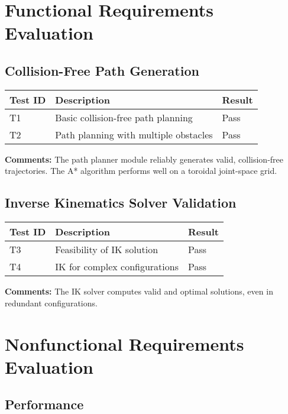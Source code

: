 \documentclass[12pt, titlepage]{article}
\begin{document}
\newpage

\tableofcontents
\newpage


\section{Functional Requirements Evaluation}

\subsection*{Collision-Free Path Generation}

\begin{tabularx}{\textwidth}{l X l}
\toprule
\textbf{Test ID} & \textbf{Description} & \textbf{Result} \\
\midrule
T1 & Basic collision-free path planning & Pass \\
T2 & Path planning with multiple obstacles & Pass \\
\bottomrule
\end{tabularx}

\textbf{Comments:} The path planner module reliably generates valid, collision-free trajectories. The A* algorithm performs well on a toroidal joint-space grid.

\subsection*{Inverse Kinematics Solver Validation}

\begin{tabularx}{\textwidth}{l X l}
\toprule
\textbf{Test ID} & \textbf{Description} & \textbf{Result} \\
\midrule
T3 & Feasibility of IK solution & Pass \\
T4 & IK for complex configurations & Pass \\
\bottomrule
\end{tabularx}

\textbf{Comments:} The IK solver computes valid and optimal solutions, even in redundant configurations.

\section{Nonfunctional Requirements Evaluation}

\subsection{Performance}
\end{document}
